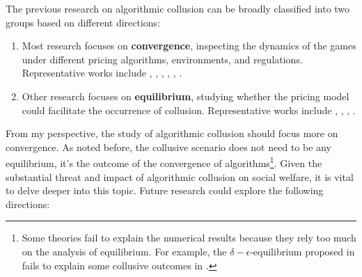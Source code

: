 \documentclass[mnsc,nonblindrev]{workingpaper}
\begin{document}
The previous research on algorithmic collusion can be broadly classified into two groups based on different directions:
\begin{enumerate}
    \item Most research focuses on \textbf{convergence}, inspecting the dynamics of the games under different pricing algorithms, environments, and regulations. Representative works include \cite{calvano2020artificial}, \cite{asker2022artificial}, \cite{hansen2021frontiers}, \cite{dolgopolov2024reinforcement}, \cite{meylahn2022learning}, \cite{johnson2023platform}.
    \item Other research focuses on \textbf{equilibrium}, studying whether the pricing model could facilitate the occurrence of collusion. Representative works include \cite{den2022artificial}, \cite{brown2023competition}, \cite{miklos2019collusion}, \cite{yang2023regulating}.
\end{enumerate} 
From my perspective, the study of algorithmic collusion should focus more on convergence. As noted before, the collusive scenario does not need to be any equilibrium, it's the outcome of the convergence of algorithms\footnote{Some theories fail to explain the numerical results because they rely too much on the analysis of equilibrium. For example, the $\delta-\epsilon$-equilibrium proposed in \cite{den2022artificial}fails to explain some collusive outcomes in \cite{asker2022artificial}.}. Given the substantial threat and impact of algorithmic collusion on social welfare, it is vital to delve deeper into this topic. Future research could explore the following directions:
\end{document}
